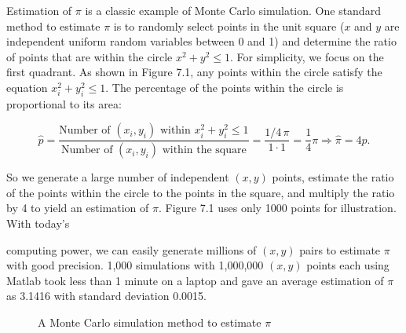 \begin{solution}
Estimation of $\pi$ is a classic example of Monte Carlo simulation. One standard method to
estimate $\pi$ is to randomly select points in the unit square ($x$ and $y$ are independent
uniform random variables between 0 and 1) and determine the ratio of points that are within the
circle $x^2+y^2\leq1$. For simplicity, we focus on the first quadrant. As shown in Figure 7.1,
any points within the circle satisfy the equation $x_i^2+y_i^2\leq1$. The percentage of the
points within the circle is proportional to its area:

\[
\hat{p}=\frac{\text{Number of }(x_i,y_i)\text{ within }x_i^2+y_i^2\leq1}
{\text{Number of }(x_i,y_i)\text{ within the square}}
=\frac{1/4\,\pi}{1\cdot1}=\frac{1}{4}\pi\Rightarrow\hat{\pi}=4\hat{p}.
\]

So we generate a large number of independent $(x,y)$ points, estimate the ratio of the points
within the circle to the points in the square, and multiply the ratio by 4 to yield an estimation
of $\pi$. Figure 7.1 uses only 1000 points for illustration. With today's



computing power, we can easily generate millions of $(x,y)$ pairs to estimate $\pi$ with good
precision. 1,000 simulations with 1,000,000 $(x,y)$ points each using Matlab took less than 1 minute
on a laptop and gave an average estimation of $\pi$ as 3.1416 with standard deviation 0.0015.

\begin{figure}[H]
\centering
{}
\caption{A Monte Carlo simulation method to estimate $\pi$}
\label{fig:zhou-figure-7-1}
\end{figure}


\end{solution}
